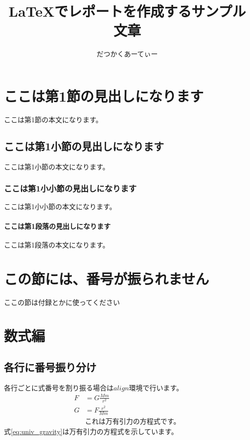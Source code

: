 \documentclass[a4j,uplatex, fleqn]{jsarticle} %
\title{\LaTeX でレポートを作成するサンプル文章}
\author{だつかくあーてぃー}
\date{}
\numberwithin{equation}{section}
\begin{document}
	\maketitle

	\section{ここは第1節の見出しになります}
		ここは第1節の本文になります。
		\subsection{ここは第1小節の見出しになります}
			ここは第1小節の本文になります。
			\subsubsection{ここは第1小小節の見出しになります}
				ここは第1小小節の本文になります。
				\paragraph{ここは第1段落の見出しになります}
					ここは第1段落の本文になります。
	\section*{この節には、番号が振られません}
		ここの節は付録とかに使ってください
	
	\section{数式編} \label{math_mode}
		\subsection{各行に番号振り分け}
			各行ごとに式番号を割り振る場合は$align$環境で行います。
			\begin{align}
				F &= G \frac{Mm}{r^{2}} \\
				G &= F \frac{r^2}{Mm} \label{eq:univ_gravity} \\
				& \mbox{これは万有引力の方程式です。}
			\end{align}
			式\ref{eq:univ_gravity}は万有引力の方程式を示しています。
\end{document}
